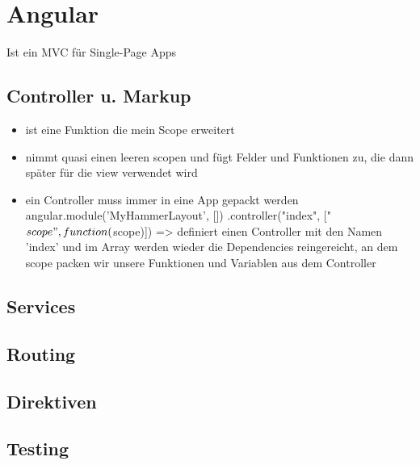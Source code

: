 \def\home{../../styles}

















\usepackage[strings]{underscore} %





\section{Angular}

Ist ein MVC für Single-Page Apps


\subsection{Controller u. Markup}
\begin{itemize}
  \item ist eine Funktion die mein Scope erweitert
  \item nimmt quasi einen leeren scopen und fügt Felder und Funktionen zu, die dann später für die view verwendet wird
  \item ein Controller muss immer in eine App gepackt werden
  angular.module('MyHammerLayout', [])
    .controller("index", ["$scope", function($scope)]) => definiert einen Controller mit den Namen 'index' und im Array
    werden wieder die Dependencies reingereicht, an dem scope packen wir unsere Funktionen und Variablen aus dem
    Controller
\end{itemize}


\subsection{Services}

\subsection{Routing}

\subsection{Direktiven}

\subsection{Testing}


